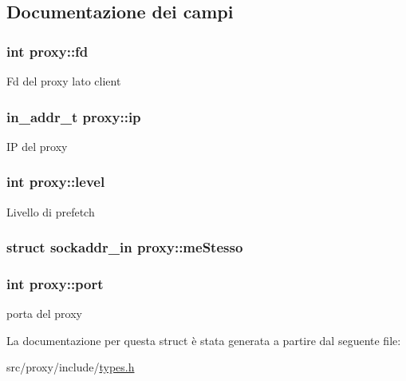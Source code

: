 \subsection{Documentazione dei campi}
\hypertarget{structproxy_a8c6d5c10908adaf299234cb136db7f0a}{
\subsubsection[{fd}]{\setlength{\rightskip}{0pt plus 5cm}int {\bf proxy::fd}}}
\label{structproxy_a8c6d5c10908adaf299234cb136db7f0a}
Fd del proxy lato client \hypertarget{structproxy_a8815d037163f8e46d1a65562abdd28cf}{
\subsubsection[{ip}]{\setlength{\rightskip}{0pt plus 5cm}in\_\-addr\_\-t {\bf proxy::ip}}}
\label{structproxy_a8815d037163f8e46d1a65562abdd28cf}
IP del proxy \hypertarget{structproxy_a9f8993de9d5183a0e089c527367bcfab}{
\subsubsection[{level}]{\setlength{\rightskip}{0pt plus 5cm}int {\bf proxy::level}}}
\label{structproxy_a9f8993de9d5183a0e089c527367bcfab}
Livello di prefetch \hypertarget{structproxy_adf308cdebd9b8469203f9fe4853eae1f}{
\subsubsection[{meStesso}]{\setlength{\rightskip}{0pt plus 5cm}struct sockaddr\_\-in {\bf proxy::meStesso}}}
\label{structproxy_adf308cdebd9b8469203f9fe4853eae1f}
\hypertarget{structproxy_a339f078e8c6ad542d969105534e272a5}{
\subsubsection[{port}]{\setlength{\rightskip}{0pt plus 5cm}int {\bf proxy::port}}}
\label{structproxy_a339f078e8c6ad542d969105534e272a5}
porta del proxy 

La documentazione per questa struct è stata generata a partire dal seguente file:\begin{DoxyCompactItemize}
\item 
src/proxy/include/\hyperlink{types_8h}{types.h}\end{DoxyCompactItemize}
